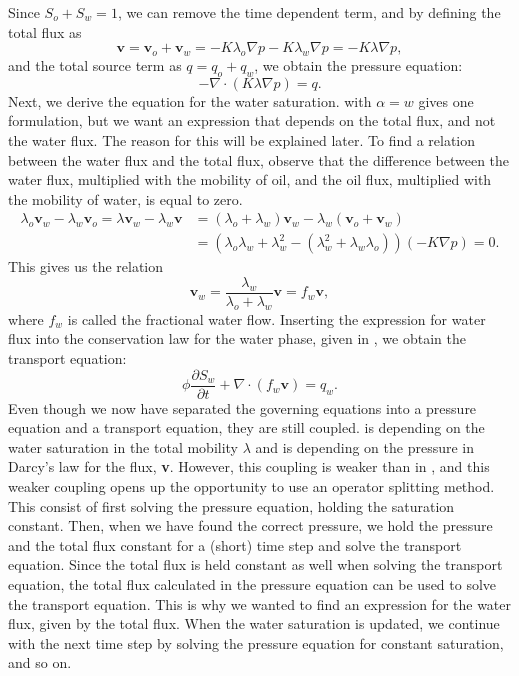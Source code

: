 Since $S_o + S_w = 1$, we can remove the time dependent term, and by defining the total flux as
\begin{equation*}
    \textbf{v} = \textbf{v}_o + \textbf{v}_w = -K\lambda_o\nabla p -K\lambda_w\nabla p = -K\lambda\nabla p,
\end{equation*}
and the total source term as $q = q_o + q_w$, we obtain the pressure equation:
\begin{equation}
    -\nabla\cdot(K\lambda\nabla p) = q.
    \label{eq:pressureEq}
\end{equation}
Next, we derive the equation for the water saturation.  with $\alpha = w$ gives one formulation, but we want an expression that depends on the total flux, and not the water flux. The reason for this will be explained later. To find a relation between the water flux and the total flux, observe that the difference between the water flux, multiplied with the mobility of oil, and the oil flux, multiplied with the mobility of water, is equal to zero.
\begin{align*}
    \lambda_o\textbf{v}_w - \lambda_w \textbf{v}_o = \lambda\textbf{v}_w - \lambda_w\textbf{v} &= (\lambda_o + \lambda_w)\textbf{v}_w - \lambda_w(\textbf{v}_o + \textbf{v}_w) \\
    &= \left(\lambda_o\lambda_w + \lambda_w^2 - (\lambda_w^2 + \lambda_w\lambda_o)\right)\left(-K\nabla p\right) = 0.
\end{align*}
This gives us the relation 
\begin{equation*}
    \textbf{v}_w = \frac{\lambda_w}{\lambda_o + \lambda_w}\textbf{v} = f_w\textbf{v},
\end{equation*}
where $f_w$ is called the fractional water flow. Inserting the expression for water flux into the conservation law for the water phase, given in  , we obtain the transport equation:
\begin{equation}
    \phi \frac{\partial S_w}{\partial t} + \nabla\cdot\left(f_w\textbf{v}\right) =  q_w.
    \label{eq:transportEq}
\end{equation}
Even though we now have separated the governing equations into a pressure equation and a transport equation, they are still coupled.  is depending on the water saturation in the total mobility $\lambda$ and  is depending on the pressure in Darcy's law for the flux, \textbf{v}. However, this coupling is weaker than in , and this weaker coupling opens up the opportunity to use an operator splitting method. This consist of first solving the pressure equation, holding the saturation constant. Then, when we have found the correct pressure, we hold the pressure and the total flux constant for a (short) time step and solve the transport equation. Since the total flux is held constant as well when solving the transport equation, the total flux calculated in the pressure equation can be used to solve the transport equation. This is why we wanted to find an expression for the water flux, given by the total flux. When the water saturation is updated, we continue with the next time step by solving the pressure equation for constant saturation, and so on.

